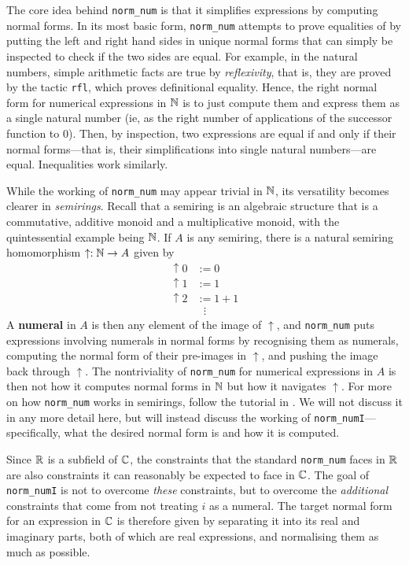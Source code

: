 The core idea behind \lstinline|norm_num| is that it simplifies expressions by computing normal forms. In its most basic form, \lstinline|norm_num| attempts to prove equalities of by putting the left and right hand sides in unique normal forms that can simply be inspected to check if the two sides are equal. For example, in the natural numbers, simple arithmetic facts are true by \textit{reflexivity}, that is, they are proved by the tactic \lstinline|rfl|, which proves definitional equality. Hence, the right normal form for numerical expressions in $\mathbb{N}$ is to just compute them and express them as a single natural number (ie, as the right number of applications of the successor function to $0$). Then, by inspection, two expressions are equal if and only if their normal forms---that is, their simplifications into single natural numbers---are equal. Inequalities work similarly.

While the working of \lstinline|norm_num| may appear trivial in $\mathbb{N}$, its versatility becomes clearer in \textit{semirings}. Recall that a semiring is an algebraic structure that is a commutative, additive monoid and a multiplicative monoid, with the quintessential example being $\mathbb{N}$. If $A$ is any semiring, there is a natural semiring homomorphism $\uparrow : \mathbb{N} \to A$ given by
\begin{align*}
    \uparrow\!0 &:= 0 \\
    \uparrow\!1 &:= 1 \\
    \uparrow\!2 &:= 1 + 1 \\
    &\ \ \ \vdots
\end{align*}
A \textbf{numeral} in $A$ is then any element of the image of $\uparrow$, and \lstinline|norm_num| puts expressions involving numerals in normal forms by recognising them as numerals, computing the normal form of their pre-images in $\uparrow$, and pushing the image back through $\uparrow$. The nontriviality of \lstinline|norm_num| for numerical expressions in $A$ is then not how it computes normal forms in $\mathbb{N}$ but how it navigates $\uparrow$. For more on how \lstinline|norm_num| works in semirings, follow the tutorial in \cite[\texttt{Metaprogramming/NormNum}]{HeatherMetaprogramming}. We will not discuss it in any more detail here, but will instead discuss the working of \lstinline|norm_numI|---specifically, what the desired normal form is and how it is computed.

Since $\mathbb{R}$ is a subfield of $\mathbb{C}$, the constraints that the standard \lstinline|norm_num| faces in $\mathbb{R}$ are also constraints it can reasonably be expected to face in $\mathbb{C}$. The goal of \lstinline|norm_numI| is not to overcome \textit{these} constraints, but to overcome the \textit{additional} constraints that come from not treating $i$ as a numeral. The target normal form for an expression in $\mathbb{C}$ is therefore given by separating it into its real and imaginary parts, both of which are real expressions, and normalising them as much as possible.

